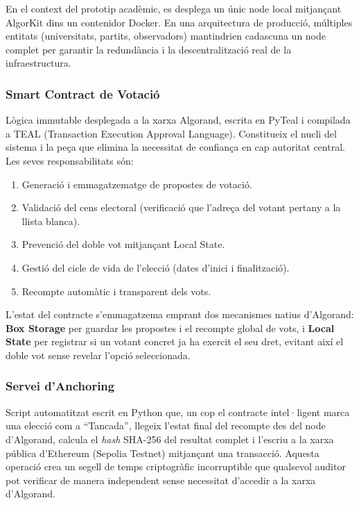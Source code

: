 En el context del prototip acadèmic, es desplega un únic node local mitjançant AlgorKit dins un contenidor Docker. En una arquitectura de producció, múltiples entitats (universitats, partits, observadors) mantindrien cadascuna un node complet per garantir la redundància i la descentralització real de la infraestructura.
 
\subsubsection{Smart Contract de Votació}
 
Lògica immutable desplegada a la xarxa Algorand, escrita en PyTeal i compilada a TEAL (Transaction Execution Approval Language). Constitueix el nucli del sistema i la peça que elimina la necessitat de confiança en cap autoritat central. Les seves responsabilitats són:
 
\begin{enumerate}[label=\roman*.]
    \item Generació i emmagatzematge de propostes de votació.
    \item Validació del cens electoral (verificació que l'adreça del votant pertany a la llista blanca).
    \item Prevenció del doble vot mitjançant Local State.
    \item Gestió del cicle de vida de l'elecció (dates d'inici i finalització).
    \item Recompte automàtic i transparent dels vots.
\end{enumerate}
 
L'estat del contracte s'emmagatzema emprant dos mecanismes natius d'Algorand: \textbf{Box Storage} per guardar les propostes i el recompte global de vots, i \textbf{Local State} per registrar si un votant concret ja ha exercit el seu dret, evitant així el doble vot sense revelar l'opció seleccionada.
 
\subsubsection{Servei d'Anchoring}
 
Script automatitzat escrit en Python que, un cop el contracte intel·ligent marca una elecció com a ``Tancada'', llegeix l'estat final del recompte des del node d'Algorand, calcula el \textit{hash} SHA-256 del resultat complet i l'escriu a la xarxa pública d'Ethereum (Sepolia Testnet) mitjançant una transacció. Aquesta operació crea un segell de temps criptogràfic incorruptible que qualsevol auditor pot verificar de manera independent sense necessitat d'accedir a la xarxa d'Algorand.
 
